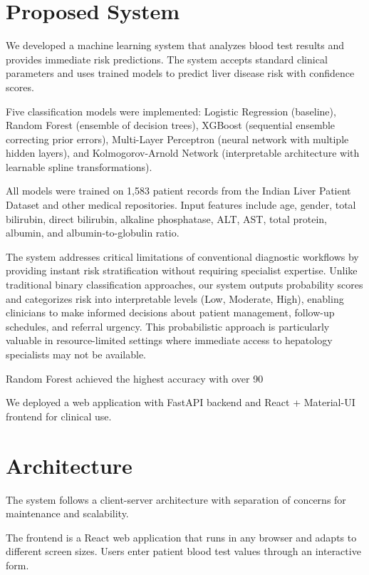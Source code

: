 \documentclass[conference]{IEEEtran}
\begin{document}
\section{Proposed System}
We developed a machine learning system that analyzes blood test results and provides immediate risk predictions. The system accepts standard clinical parameters and uses trained models to predict liver disease risk with confidence scores.

Five classification models were implemented: Logistic Regression (baseline), Random Forest (ensemble of decision trees), XGBoost (sequential ensemble correcting prior errors), Multi-Layer Perceptron (neural network with multiple hidden layers), and Kolmogorov-Arnold Network (interpretable architecture with learnable spline transformations).

All models were trained on 1,583 patient records from the Indian Liver Patient Dataset and other medical repositories. Input features include age, gender, total bilirubin, direct bilirubin, alkaline phosphatase, ALT, AST, total protein, albumin, and albumin-to-globulin ratio.

The system addresses critical limitations of conventional diagnostic workflows by providing instant risk stratification without requiring specialist expertise. Unlike traditional binary classification approaches, our system outputs probability scores and categorizes risk into interpretable levels (Low, Moderate, High), enabling clinicians to make informed decisions about patient management, follow-up schedules, and referral urgency. This probabilistic approach is particularly valuable in resource-limited settings where immediate access to hepatology specialists may not be available.

Random Forest achieved the highest accuracy with over 90%

We deployed a web application with FastAPI backend and React + Material-UI frontend for clinical use.

\section{Architecture}

The system follows a client-server architecture with separation of concerns for maintenance and scalability.

The frontend is a React web application that runs in any browser and adapts to different screen sizes. Users enter patient blood test values through an interactive form.
\end{document}

